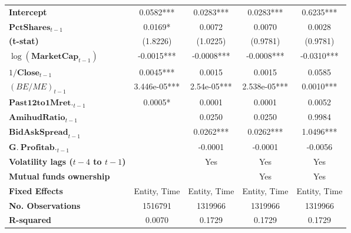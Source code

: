 {\begin{longtable}{>{\bfseries}lcccc}
Intercept                &       0.0582***       &             0.0283***            &             0.0283***            &         0.6235***         \\
\rowcolor{blue!20}
$\mathbf{PctShares}_{t-1}$            &       0.0169*      &             0.0072            &             0.0070            &         0.0028         \\
(t-stat)                                &      (1.8226)      &            (1.0225)           &            (0.9781)           &        (0.9781)        \\
$\log(\mathbf{MarketCap}_{t-1})$    &      -0.0015***       &            -0.0008***            &            -0.0008***          &        -0.0310***         \\
$1/\mathbf{Close}_{t-1}$                    &       0.0045***       &             0.0015            &             0.0015            &         0.0585         \\
$\left(BE/ME\right)_{t-1}$      &     3.446e-05***      &            2.54e-05***           &           2.538e-05***           &         0.0010***         \\
$\mathbf{Past 12 to 1M ret.}_{t-1}$       &       0.0005*       &             0.0001            &             0.0001            &         0.0052         \\
$\mathbf{AmihudRatio}_{t-1}$       &                    &             0.0250            &             0.0250            &         0.9984         \\
$\mathbf{BidAskSpread}_{t-1}$            &                    &             0.0262***            &             0.0262***            &         1.0496***         \\
$\mathbf{G.~Profitab.}_{t-1}$      &                    &            -0.0001            &            -0.0001            &        -0.0056         \\
Volatility lags ($t - 4$ to $t - 1$) & & Yes & Yes & Yes\\
Mutual funds ownership &  &  & Yes  & Yes\\
\midrule
Fixed Effects   &     Entity, Time       &        Entity, Time             &            Entity, Time          &       Entity, Time  \\
\bottomrule
\toprule
\textbf{No. Observations}                  &      1516791       &            1319966            &            1319966            &        1319966         \\
\textbf{R-squared}                         &       0.0070       &             0.1729            &             0.1729            &         0.1729         \\

\end{longtable}}
